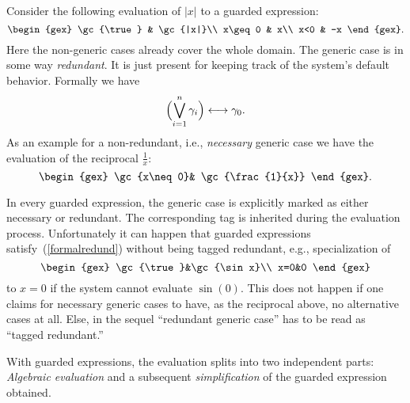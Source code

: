 Consider the following evaluation of $|x|$ to a guarded expression:
$$
\begin{gex}
\gc{\true} & \gc{|x|}\\
x\geq0 & x\\
x<0 & -x
\end{gex}.
$$
Here the non-generic cases already cover the whole domain. The
generic case is in some way {\em redundant}. It is just present for
keeping track of the system's default behavior. Formally we have
\begin{equation}
\Bigl(\bigvee_{i=1}^n\gamma_i\Bigr)\longleftrightarrow\gamma_0.
\label{formalredund}
\end{equation}
As an example for a non-redundant, i.e., {\em necessary} generic case
we have the evaluation of the reciprocal $\frac{1}{x}$:
$$
\begin{gex}
\gc{x\neq0}& \gc{\frac{1}{x}}
\end{gex}.
$$

In every guarded expression, the generic case is explicitly marked as
either necessary or redundant. The corresponding tag is inherited
during the evaluation process. Unfortunately it can happen that
guarded expressions satisfy~(\ref{formalredund}) without being tagged
redundant, e.g., specialization of
$$
\begin{gex}
\gc{\true}&\gc{\sin x}\\
x=0&0
\end{gex}
$$
to $x=0$ if the system cannot evaluate $\sin(0)$. This does not happen
if one claims for necessary generic cases to have, as the reciprocal
above, no alternative cases at all. Else, in the sequel ``redundant
generic case'' has to be read as ``tagged redundant.''

With guarded expressions, the evaluation splits into two independent
parts: {\em Algebraic evaluation} and a subsequent {\em
simplification} of the guarded expression obtained.
%
